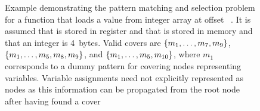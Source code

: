 \begin{figure}
  \centering%
                {%
                  \begin{lstpage}{2.6cm}%
                  \end{lstpage}%
                }%
  \hfill%
  \hfill%

  \caption[Example of the pattern matching and selection problem]%
          {%
            Example demonstrating the pattern matching and selection problem for
            a function that loads a value from integer array  at
            offset \mbox{ \irCode*{\irAddText{}} }.
            It is assumed that  is
            stored in register and that  is stored in memory and that
            an integer is 4~bytes.
            Valid covers are \mbox{$\mSet{m_1, \ldots, m_7, m_9}$},
            \mbox{$\mSet{m_1, \ldots, m_5, m_8, m_9}$}, and
            \mbox{$\mSet{m_1, \ldots, m_5, m_{10}}$}, where $m_1$ corresponds to
            a dummy pattern for covering nodes representing variables.
            Variable assignments need not explicitly represented as nodes as
            this information can be propagated from the root node after having
            found a cover%
          }
\end{figure}

